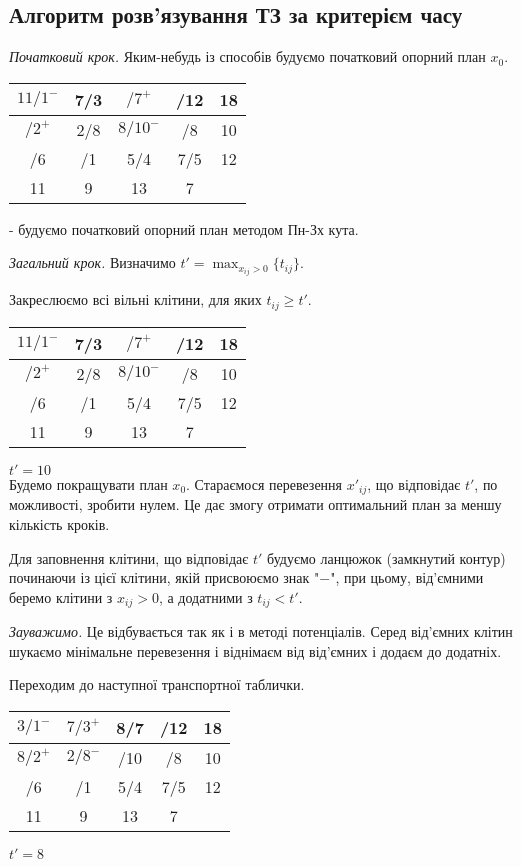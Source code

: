 \documentclass[12pt,a4paper]{book}
\newenvironment{slim_enumerate}{
\begin{enumerate}
  \setlength{\itemsep}{1pt}
  \setlength{\parskip}{0pt}
  \setlength{\parsep}{0pt}}
{\end{enumerate}}
\begin{document}
\subsection{Алгоритм розв’язування ТЗ за критерієм часу}
\begin{slim_enumerate}
  \item {\it Початковий крок.} Яким-небудь із способів будуємо початковий опорний план $x_0$.\\
\begin{tabular}{ | c | c | c | c | c | }
\hline
$11/1^-$	&	7/3	&	$/7^+$	&\cellcolor[rgb]{0.8,0.8,0.8}	/12	&	18\\
\hline
$/2^+$	&	2/8	&	$8/10^-$	&	/8	&	10\\
\hline
/6	&	/1	&	5/4	&	7/5	&	12\\
\hline
11	&	9	&	13	&	7	&\\
\hline
\end{tabular}
- будуємо початковий опорний план методом Пн-Зх кута.

  \item {\it Загальний крок.} Визначимо $t'=\displaystyle\max_{x_{ij}>0}\{t_{ij}\}$.

Закреслюємо всі вільні клітини, для яких $t_{ij} \ge t'$.

\begin{tabular}{ | c | c | c | c | c | }
\hline
$11/1^-$	&	7/3	&	$/7^+$	&\cellcolor[rgb]{0.8,0.8,0.8}	/12	&	18\\
\hline
$/2^+$	&	2/8	&	$8/10^-$	&	/8	&	10\\
\hline
/6	&	/1	&	5/4	&	7/5	&	12\\
\hline
11	&	9	&	13	&	7	&\\
\hline
\end{tabular}
$t'=10$\\

Будемо покращувати план $x_0$. Стараємося перевезення $x'_{ij}$, що відповідає $t'$, по можливості, зробити нулем. Це дає змогу отримати оптимальний план за меншу кількість кроків.

Для заповнення клітини, що відповідає $t'$ будуємо ланцюжок (замкнутий контур) починаючи із цієї клітини, якій присвоюємо знак "$-$", при цьому, від’ємними беремо клітини з $x_{ij}>0$, а додатними з $t_{ij}<t'$.

{\it Зауважимо.} Це відбувається так як і в методі потенціалів. Серед від’ємних клітин шукаємо мінімальне перевезення і віднімаєм від від’ємних і додаєм до додатніх.

Переходим до наступної транспортної таблички.\\
\begin{tabular}{ | c | c | c | c | c | }
\hline
$3/1^-$	&	$7/3^+$	&	8/7	&\cellcolor[rgb]{0.8,0.8,0.8}	/12	&	18\\
\hline
$8/2^+$	&	$2/8^-$	&\cellcolor[rgb]{0.8,0.8,0.8}	/10	&\cellcolor[rgb]{0.8,0.8,0.8}	/8	&	10\\
\hline
/6	&	/1	&	5/4	&	7/5	&	12\\
\hline
11	&	9	&	13	&	7	&\\
\hline
\end{tabular}
$t'=8$\\


\end{slim_enumerate}
\end{document}
